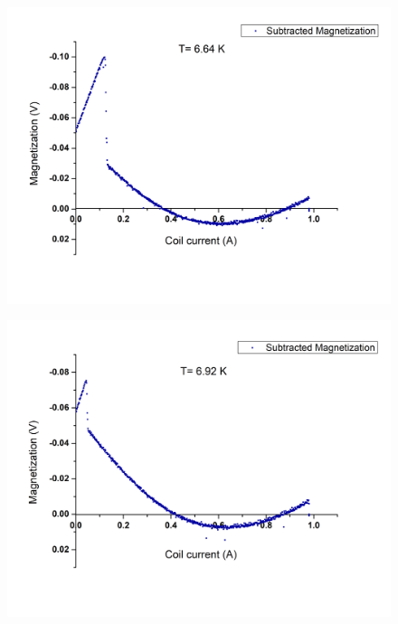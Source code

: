 \documentclass[openany,11pt,a4paper]{report}
\begin{document}
\begin{figure}[H]
\begin{center}
\includegraphics[scale=0.5]{664.jpg}
\end{center}
\end{figure}

\begin{figure}[H]
\begin{center}
\includegraphics[scale=0.5]{692.jpg}
\end{center}
\end{figure}
\end{document}
